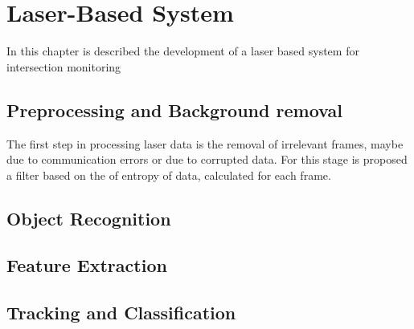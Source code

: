 
\chapter{Laser-Based System}

In this chapter is described the development of a laser based system for intersection monitoring

\section{Preprocessing and Background removal}

The first step in processing laser data is the removal of irrelevant frames, maybe due to communication errors or due to corrupted data. For this stage is proposed a filter based on the of entropy of data, calculated for each frame.

\section{Object Recognition}
\section{Feature Extraction}
\section{Tracking and Classification}
